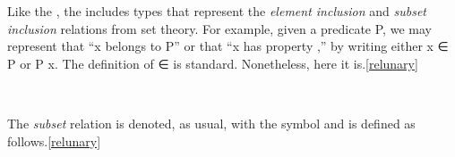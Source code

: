 Like the \agdastdlib, the \ualib includes types that represent the \emph{element inclusion} and \emph{subset inclusion} relations from set theory. For example, given a predicate \af P, we may represent that  ``\ab x belongs to \af P'' or that ``\ab x has property ,'' by writing either \ab x \af ∈ \af P or \af P \ab x.  The definition of \af ∈ is standard. Nonetheless, here it is.\cref{relunary}
\ccpad
\begin{code}%
\>[1]\AgdaSpace{}%
\AgdaSymbol{:}\AgdaSpace{}%
\AgdaSpace{}%
\AgdaSpace{}%
\AgdaSpace{}%
\AgdaSpace{}%
\AgdaSpace{}%
\AgdaSpace{}%
%
\<%
\\
%
\>[1]\AgdaSpace{}%
\AgdaSpace{}%
\AgdaSpace{}%
\AgdaSymbol{=}\AgdaSpace{}%
\AgdaSpace{}%
\<%
\end{code}
\ccpad
The \textit{subset} relation is denoted, as usual, with the  symbol and is defined as follows.\cref{relunary}
\ccpad
\begin{code}%
\>[0]\AgdaSpace{}%
\AgdaSymbol{:}\AgdaSpace{}%
\AgdaSpace{}%
\AgdaSpace{}%
\AgdaSpace{}%
\AgdaSpace{}%
\AgdaSpace{}%
\AgdaSpace{}%
\AgdaSpace{}%
\AgdaSpace{}%
\AgdaSpace{}%
\AgdaSpace{}%
\AgdaSpace{}%
\AgdaSpace{}%
%
\<%
\\
\>[0]\AgdaSpace{}%
\AgdaSpace{}%
\AgdaSpace{}%
\AgdaSymbol{=}\AgdaSpace{}%
\AgdaSpace{}%
\AgdaSymbol{\{}\AgdaSymbol{\}}\AgdaSpace{}%
\AgdaSpace{}%
\AgdaSpace{}%
\AgdaSpace{}%
\AgdaSpace{}%
\AgdaSpace{}%
\AgdaSpace{}%
\AgdaSpace{}%
\<%
\end{code}

